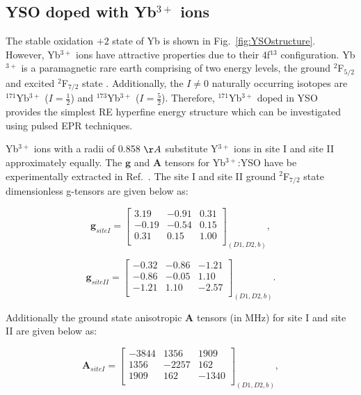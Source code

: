 \subsection{\label{sec:YSOdopedYbions}YSO doped with Yb$^{3+}$ ions}
The stable oxidation $+2$ state of Yb is shown in Fig.~\ref{fig:YSOstructure}. However, Yb$^{3+}$ ions have attractive properties due to their 4f$^{13}$ configuration. Yb$^{3+}$ is a paramagnetic rare earth comprising of two energy levels, the ground $^{2}$F$_{5/2}$ and excited $^{2}$F$_{7/2}$ state \citep{PhysRevB.94.155116}. Additionally, the $I \neq 0$ naturally occurring isotopes are $^{171}$Yb$^{3+}$ ($I=\frac{1}{2}$) and $^{173}$Yb$^{3+}$ ($I=\frac{5}{2}$). Therefore, $^{171}$Yb$^{3+}$ doped in YSO provides the simplest RE hyperfine energy structure which can be investigated using pulsed EPR techniques.  

Yb$^{3+}$ ions with a radii of 0.858 $\AA$ substitute Y$^{3+}$ ions in site I and site II approximately equally. The $\bm{g}$ and $\bm{A}$ tensors for Yb$^{3+}$:YSO have be experimentally extracted in Ref.~\citep{PhysRevB.94.155116}. The site I and site II ground $^{2}$F$_{7/2}$ state dimensionless g-tensors are given below as:

 
\begin{equation}
\label{eq:gtensorsiteI}
\bm{g}_{siteI}=\begin{bmatrix}
3.19 & -0.91 & 0.31 \\ 
-0.19 & -0.54 & 0.15\\ 
0.31 & 0.15 & 1.00 \\
\end{bmatrix}_{(D1,D2,b)},
\end{equation}  
  


\begin{equation}
\label{eq:gtensorsite}
\bm{g}_{siteII}=\begin{bmatrix}
-0.32 & -0.86 & -1.21 \\ 
-0.86 & -0.05 & 1.10 \\ 
-1.21 & 1.10 & -2.57 \\
\end{bmatrix}_{(D1,D2,b)}.
\end{equation}  


Additionally the ground state anisotropic $\bm{A}$ tensors (in MHz) for site I and site II are given below as:


\begin{equation}
\label{eq:AtensorsiteI}
\bm{A}_{siteI}=\begin{bmatrix}
-3844 & 1356 & 1909 \\ 
1356 & -2257 & 162 \\ 
1909 & 162 & -1340 \\
\end{bmatrix}_{(D1,D2,b)},
\end{equation}  

